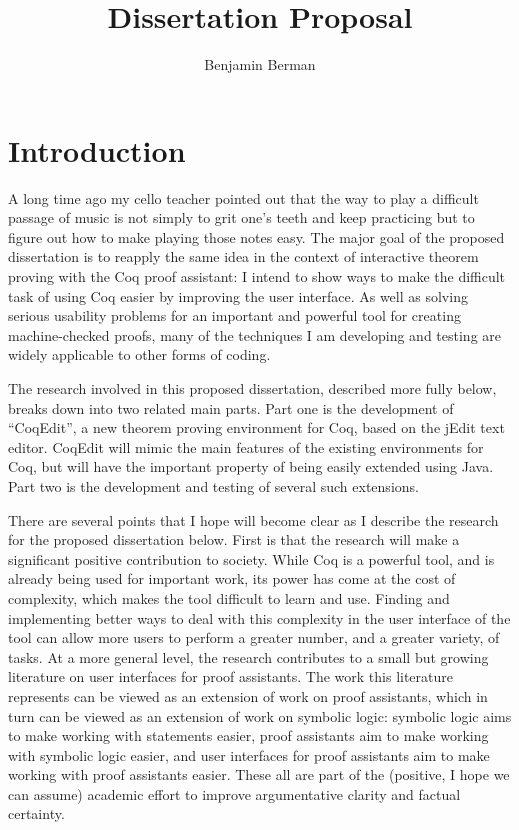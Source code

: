 \documentclass[11pt]{amsart}
\title{Dissertation Proposal}
\author{Benjamin Berman}
\begin{document}
\maketitle
\section{Introduction}

A long time ago my cello teacher pointed out that the way to play a difficult passage of music is not simply to grit one's teeth and keep practicing but to figure out how to make playing those notes easy.  The major goal of the proposed dissertation is to reapply the same idea in the context of interactive theorem proving with the Coq proof assistant:  I intend to show ways to make the difficult task of using Coq easier by improving the user interface.  As well as solving serious usability problems for an important and powerful tool for creating machine-checked proofs, many of the techniques I am developing and testing are widely applicable to other forms of coding.

The research involved in this proposed dissertation, described more fully below, breaks down into two related main parts.  Part one is the development of ``CoqEdit'', a new theorem proving environment for Coq, based on the jEdit text editor.  CoqEdit will mimic the main features of the existing environments for Coq, but will have the important property of being easily extended using Java.  Part two is the development and testing of several such extensions.

There are several points that I hope will become clear as I describe the research for the proposed dissertation below.  First is that the research will make a significant positive contribution to society.  While Coq is a powerful tool, and is already being used for important work, its power has come at the cost of complexity, which makes the tool difficult to learn and use.  Finding and implementing better ways to deal with this complexity in the user interface of the tool can allow more users to perform a greater number, and a greater variety, of tasks.  At a more general level, the research contributes to a small but growing literature on user interfaces for proof assistants.  The work this literature represents can be viewed as an extension of work on proof assistants, which in turn can be viewed as an extension of work on symbolic logic:  symbolic logic aims to make working with statements easier, proof assistants aim to make working with symbolic logic easier, and user interfaces for proof assistants aim to make working with proof assistants easier.  These all are part of the (positive, I hope we can assume) academic effort to improve argumentative clarity and factual certainty.  
	
\end{document}
